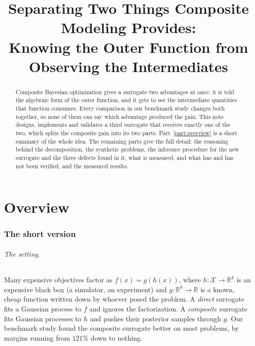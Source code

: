 \documentclass[11pt]{article}
\title{Separating Two Things Composite Modeling Provides:\\
Knowing the Outer Function from Observing the Intermediates}
\author{}
\date{}
\newcommand{\R}{\mathbb{R}}
\newcommand{\Xs}{\mathcal{X}}
\begin{document}
\maketitle

\begin{abstract}
\noindent
Composite Bayesian optimization gives a surrogate two advantages at once: it is
told the algebraic form of the outer function, and it gets to see the
intermediate quantities that function consumes. Every comparison in our
benchmark study changes both together, so none of them can say which advantage
produced the gain. This note designs, implements and validates a third
surrogate that receives exactly one of the two, which splits the composite gain
into its two parts. Part~\ref{part:overview} is a short summary of the whole
idea. The remaining parts give the full detail: the reasoning behind the
decomposition, the synthetic problems, the inference procedure for the new
surrogate and the three defects found in it, what is measured, and what has and
has not been verified, and the measured results.
\end{abstract}

\tableofcontents

\part{Overview}
\label{part:overview}

\section{The short version}

\paragraph{The setting.} Many expensive objectives factor as $f(x)=g(h(x))$,
where $h:\Xs\to\R^k$ is an expensive black box (a simulator, an experiment) and
$g:\R^k\to\R$ is a known, cheap function written down by whoever posed the
problem. A \emph{direct} surrogate fits a Gaussian process to $f$ and ignores
the factorization. A \emph{composite} surrogate fits Gaussian processes to $h$
and pushes their posterior samples through $g$. Our benchmark study found the
composite surrogate better on most problems, by margins running from $121\%$
down to nothing.
\end{document}
